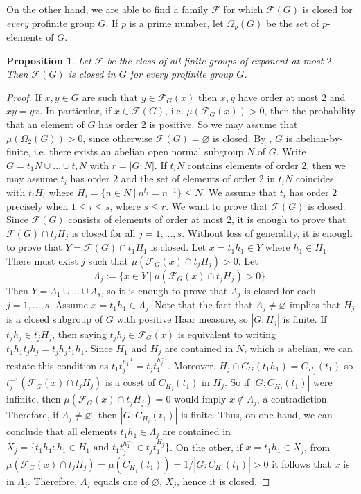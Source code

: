 \documentclass{amsart}
\newtheorem{prop}[thm]{Proposition} \newtheorem{rem}[thm]{Remark}
\numberwithin{equation}{section}
\begin{document}
On the other hand, we are able to find a family $\mathcal F$ for which $\mathcal F(G)$ is closed for \emph{every} profinite group $G$. {If $p$ is a prime number, let $\Omega_p(G)$ be the set of $p$-elements of $G$.}

\begin{prop} \label{exp2}
Let $\mathcal F$ be the class of all finite groups of exponent at most $2$. Then $\mathcal{F}(G)$ is closed in $G$ for every profinite group $G$.
\end{prop}
\begin{proof}
If $x,y \in G$ are such that $y \in \mathcal{F}_G(x)$ then $x,y$ have order at most $2$ and $xy=yx$. In particular, if $x \in \mathcal{F}(G)$, i.e. $\mu(\mathcal{F}_G(x))>0$, then the probability that an element of $G$ has order $2$ is positive. So we may assume that $\mu(\Omega_2(G))>0$, since otherwise $\mathcal{F}(G) = \varnothing$ is closed. By \cite[Theorem 2]{LP}, $G$ is abelian-by-finite, i.e. there exists an abelian open normal subgroup $N$ of $G$. Write $G=t_1N \cup \ldots \cup t_rN$ with $r=|G:N|$. If $t_iN$ contains elements of order $2$, then we may assume $t_i$ has order $2$ and the set of elements of order $2$ in $t_iN$ coincides with $t_iH_i$ where $H_i=\{n \in N\ |\ n^{t_i}=n^{-1}\} \leq N$. We assume that $t_i$ has order $2$ precisely when $1 \leq i \leq s$, where $s \leq r$. We want to prove that $\mathcal{F}(G)$ is closed. Since $\mathcal{F}(G)$ consists of elements of order at most $2$, it is enough to prove that $\mathcal{F}(G) \cap t_jH_j$ is closed for all $j=1,\ldots,s$. Without loss of generality, it is enough to prove that $Y=\mathcal{F}(G) \cap t_1H_1$ is closed. Let $x=t_1h_1 \in Y$ where $h_1 \in H_1$. There must exist $j$ such that $\mu(\mathcal{F}_G(x) \cap t_jH_j) > 0$. Let $$\Lambda_j := \{x \in Y\ |\ \mu(\mathcal{F}_G(x) \cap t_jH_j) > 0\}.$$
Then $Y=\Lambda_1 \cup \ldots \cup \Lambda_s$, so it is enough to prove that $\Lambda_j$ is closed for each $j=1,\ldots,s$. Assume $x = t_1h_1 \in \Lambda_j$. Note that the fact that $\Lambda_j \neq \varnothing$ implies that $H_j$ is a closed subgroup of $G$ with positive Haar measure, so $|G:H_j|$ is finite. If $t_jh_j \in t_jH_j$, then saying $t_jh_j \in \mathcal{F}_G(x)$ is equivalent to writing $t_1h_1t_jh_j=t_jh_jt_1h_1$. Since $H_1$ and $H_j$ are contained in $N$, which is abelian, we can restate this condition as $t_1 t_j^{h_1^{-1}} = t_j t_1^{h_j^{-1}}$. Moreover, $H_j \cap C_G(t_1h_1) = C_{H_j}(t_1)$ so $t_j^{-1} (\mathcal{F}_G(x) \cap t_jH_j)$ is a coset of $C_{H_j}(t_1)$ in $H_j$. So if $|G:C_{H_j}(t_1)|$ were infinite, then $\mu(\mathcal{F}_G(x) \cap t_jH_j)=0$ would imply $x \not \in \Lambda_j$, a contradiction. Therefore, if $\Lambda_j \neq \varnothing$, then $|G:C_{H_j}(t_1)|$ is finite. Thus, on one hand, we can conclude that all elements $t_1h_1 \in \Lambda_j$ are contained in $X_j =\{t_1h_1 : h_1 \in H_1 \text{ and }t_1t_j^{h_1^{-1}} \in t_jt_1^{H_j}\}$. On the other, if $x = t_1h_1 \in X_j$, from $\mu(\mathcal{F}_G(x) \cap t_jH_j) = \mu(C_{H_j}(t_1)) = 1/|G:C_{H_j}(t_1)| > 0$ it follows that $x$ is in $\Lambda_j$. Therefore, $\Lambda_j$ equals one of $\varnothing$, $X_j$, hence it is closed.
\end{proof}
\end{document}
